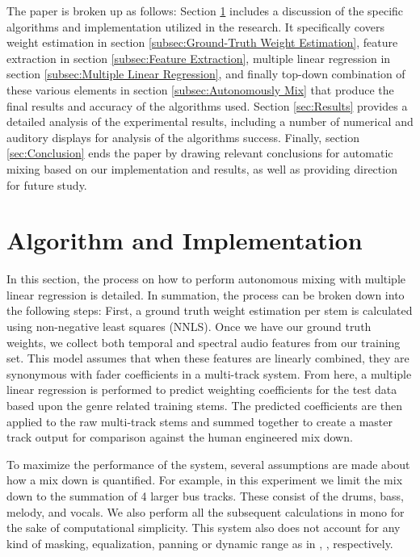 \documentclass{article}
\begin{document}
The paper is broken up as follows: Section \ref{sec:Algorithm and Implementation} includes a discussion of the specific algorithms and implementation utilized in the research.  It specifically covers weight estimation in section \ref{subsec:Ground-Truth Weight Estimation}, feature extraction in section \ref{subsec:Feature Extraction}, multiple linear regression in section \ref{subsec:Multiple Linear Regression}, and finally top-down combination of these various elements in section \ref{subsec:Autonomously Mix} that produce the final results and accuracy of the algorithms used.  Section \ref{sec:Results} provides a detailed analysis of the experimental results, including a number of numerical and auditory displays for analysis of the algorithms success.  Finally, section \ref{sec:Conclusion} ends the paper by drawing relevant conclusions for automatic mixing based on our implementation and results, as well as providing direction for future study. 

\section{Algorithm and Implementation}
\label{sec:Algorithm and Implementation}

In this section, the process on how to perform autonomous mixing with multiple linear regression is detailed.  In summation, the process can be broken down into the following steps: First, a ground truth weight estimation per stem is calculated using non-negative least squares (NNLS).  Once we have our ground truth weights, we collect both temporal and spectral audio features from our training set.  This model assumes that when these features are linearly combined, they are synonymous with fader coefficients in a multi-track system.  From here, a multiple linear regression is performed to predict weighting coefficients for the test data based upon the genre related training stems.  The predicted coefficients are then applied to the raw multi-track stems and summed together to create a master track output for comparison against the human engineered mix down.

To maximize the performance of the system, several assumptions are made about how a mix down is quantified.  For example, in this experiment we limit the mix down to the summation of 4 larger bus tracks.  These consist of the drums, bass, melody, and vocals.  We also perform all the subsequent calculations in mono for the sake of computational simplicity.  This system also does not account for any kind of masking, equalization, panning or dynamic range as in \cite{mansbridge2012implementation}, \cite{ma2013implementation}, \cite{vickers2001automatic} respectively.
\end{document}
